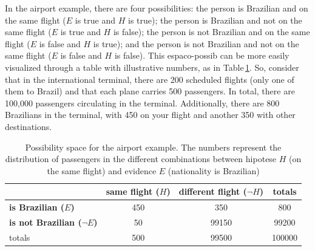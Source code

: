 \documentclass[./main_en.tex]{subfiles}
\begin{document}
\par In the airport example, there are four possibilities: the person is Brazilian and on the same flight ($E$ is true and $H$ is true); the person is Brazilian and not on the same flight ($E$ is true and $H$ is false); the person is not Brazilian and on the same flight ($E$ is false and $H$ is true); and the person is not Brazilian and not on the same flight ($E$ is false and $H$ is false). This \gls{espaco-possib} can be more easily visualized through a table with illustrative numbers, as in Table\,\ref{tbl:bayes-aeroporto}. So, consider that in the international terminal, there are 200 scheduled flights (only one of them to Brazil) and that each plane carries 500 passengers. In total, there are 100,000 passengers circulating in the terminal. Additionally, there are 800 Brazilians in the terminal, with 450 on your flight and another 350 with other destinations.
\begin{table}[ht]
    \centering	
    \small
    \sffamily
    \begin{tabular}{ l  c  c  c} %
       & \textbf{same flight ($H$)} & \textbf{different flight ($\neg H$)} & totals\\  
        \hline
        \textbf{is Brazilian ($E$)} & 450 & 350 & 800\\
        \textbf{is not Brazilian ($\neg E$)} & 50 & 99150 & 99200\\
        \hline
        totals & 500 & 99500 & 100000\\
    \end{tabular}
    \caption[Possibility space for the airport example]{Possibility space for the airport example. The numbers represent the distribution of passengers in the different combinations between \gls{hipotese} $H$ (on the same flight) and evidence $E$ (nationality is Brazilian)}
    \label{tbl:bayes-aeroporto}
\end{table} 
\end{document}

